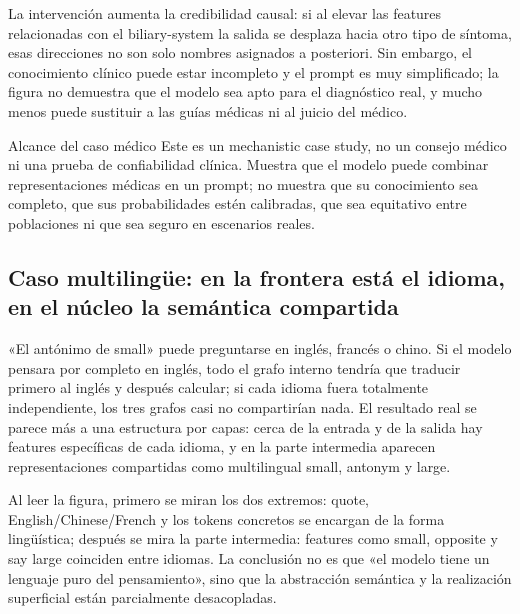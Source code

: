 La intervención aumenta la credibilidad causal: si al elevar las features relacionadas con el biliary-system la salida se desplaza hacia otro tipo de síntoma, esas direcciones no son solo nombres asignados a posteriori. Sin embargo, el conocimiento clínico puede estar incompleto y el prompt es muy simplificado; la figura no demuestra que el modelo sea apto para el diagnóstico real, y mucho menos puede sustituir a las guías médicas ni al juicio del médico.

\begin{warningbox}{Alcance del caso médico}
Este es un mechanistic case study, no un consejo médico ni una prueba de confiabilidad clínica. Muestra que el modelo puede combinar representaciones médicas en un prompt; no muestra que su conocimiento sea completo, que sus probabilidades estén calibradas, que sea equitativo entre poblaciones ni que sea seguro en escenarios reales.
\end{warningbox}


\subsection{Caso multilingüe: en la frontera está el idioma, en el núcleo la semántica compartida}

«El antónimo de small» puede preguntarse en inglés, francés o chino. Si el modelo pensara por completo en inglés, todo el grafo interno tendría que traducir primero al inglés y después calcular; si cada idioma fuera totalmente independiente, los tres grafos casi no compartirían nada. El resultado real se parece más a una estructura por capas: cerca de la entrada y de la salida hay features específicas de cada idioma, y en la parte intermedia aparecen representaciones compartidas como multilingual small, antonym y large.



Al leer la figura, primero se miran los dos extremos: quote, English/Chinese/French y los tokens concretos se encargan de la forma lingüística; después se mira la parte intermedia: features como small, opposite y say large coinciden entre idiomas. La conclusión no es que «el modelo tiene un lenguaje puro del pensamiento», sino que la abstracción semántica y la realización superficial están parcialmente desacopladas.

